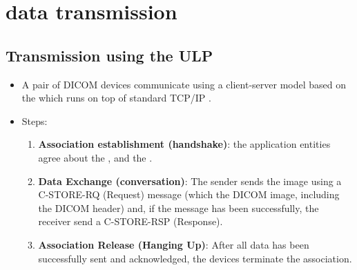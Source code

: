\chapter{ data transmission}

\section{Transmission using the \gls{ULP}}
\begin{itemize}
\item A pair of \gls{DICOM} devices communicate using a client-server
  model based on the  which runs on top of standard TCP/IP \cite{DICOM_ULP}.
\item Steps:
  \begin{enumerate}
  \item \textbf{Association establishment (handshake)}: the
    application entities agree about the , and the
    .
  \item \textbf{Data Exchange (conversation)}: The sender sends the
    image using a C-STORE-RQ (Request) message (which the DICOM image,
    including the DICOM header) and, if the message has been
    successfully, the receiver send a C-STORE-RSP (Response).
  \item \textbf{Association Release (Hanging Up)}: After all data has
    been successfully sent and acknowledged, the devices terminate the
    association.
  \end{enumerate}
\end{itemize}

